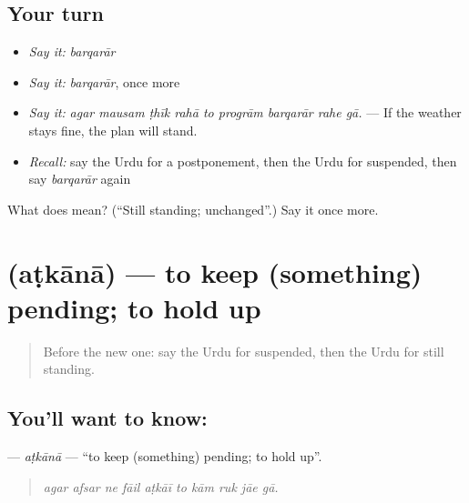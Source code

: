 \subsection*{Your turn}
\begin{itemize}
\raggedright
  \item \emph{Say it:} \emph{barqarār}
  \item \emph{Say it:} \emph{barqarār}, once more
  \item \emph{Say it:} \emph{agar mausam ṭhīk rahā to progrām barqarār rahe gā.} — If the weather stays fine, the plan will stand.
  \item \emph{Recall:} say the Urdu for a postponement, then the Urdu for suspended, then say \emph{barqarār} again
\end{itemize}

\begin{tcolorbox}[breakable,colback=teal!4,colframe=teal!35!black,title={Before you move on}]
What does  mean? (\textquotedblleft{}Still standing; unchanged\textquotedblright{}.) Say it once more.
\end{tcolorbox}
\section[\texorpdfstring{\ur{اٹکانا} (aṭkānā)}{اٹکانا (aṭkānā)}]{ (aṭkānā) — to keep (something) pending; to hold up}

\label{lesson:UR-C525-atkana}



\begin{quote}
Before the new one: say the Urdu for suspended, then the Urdu for still standing.
\end{quote}

\subsection*{You'll want to know: }
\textbf{} — \emph{aṭkānā} — \textquotedblleft{}to keep (something) pending; to hold up\textquotedblright{}.

\begin{quote}
         
\end{quote}

\begin{quote}
\emph{agar afsar ne fāil aṭkāī to kām ruk jāe gā.}
\end{quote}

